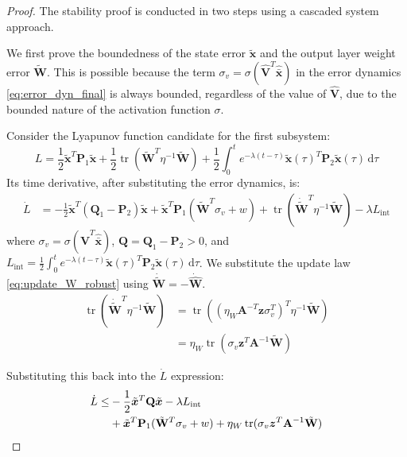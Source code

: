 \documentclass[11pt, a4paper]{article}
\newcommand{\tr}{\operatorname{tr}}
\newcommand{\ud}{\,\mathrm{d}}
\newcommand{\xtilde}{\tilde{\bm{x}}}
\newcommand{\xhatbar}{\hat{\bar{\bm{x}}}}
\newcommand{\Wtilde}{\tilde{\mathbf{W}}}
\newcommand{\What}{\hat{\mathbf{W}}}
\newcommand{\Vhat}{\hat{\mathbf{V}}}
\begin{document}
\begin{proof}
The stability proof is conducted in two steps using a cascaded system approach.


We first prove the boundedness of the state error $\xtilde$ and the output layer weight error $\Wtilde$. This is possible because the term $\sigma_v = \sigma(\Vhat^T \xhatbar)$ in the error dynamics \eqref{eq:error_dyn_final} is always bounded, regardless of the value of $\Vhat$, due to the bounded nature of the activation function $\sigma$.

Consider the Lyapunov function candidate for the first subsystem:
\begin{equation}
    L = \frac{1}{2}\xtilde^T \mathbf{P}_1 \xtilde + \frac{1}{2}\tr(\Wtilde^T \eta^{-1}\Wtilde) + \frac{1}{2} \int_{0}^{t} e^{-\lambda(t-\tau)} \xtilde(\tau)^T \mathbf{P}_2 \xtilde(\tau) \ud\tau
\end{equation}
Its time derivative, after substituting the error dynamics, is:
\begin{align}
    \dot{L} &= -\frac{1}{2}\xtilde^T(\mathbf{Q}_1 - \mathbf{P}_2)\xtilde + \xtilde^T\mathbf{P}_1 (\Wtilde^T \sigma_v + w) + \tr(\dot{\Wtilde}^T\eta^{-1} \Wtilde) - \lambda L_{\text{int}}
\end{align}
where $\sigma_v = \sigma(\Vhat^T\xhatbar)$, $\mathbf{Q} = \mathbf{Q}_1 - \mathbf{P}_2 > 0$, and $L_{\text{int}} = \frac{1}{2} \int_{0}^{t} e^{-\lambda(t-\tau)} \xtilde(\tau)^T \mathbf{P}_2 \xtilde(\tau) \ud\tau$.
We substitute the update law \eqref{eq:update_W_robust} using $\dot{\Wtilde} = -\dot{\What}$. 
\begin{align*}
    \tr(\dot{\Wtilde}^T \eta^{-1}\Wtilde) &= \tr\left( \left(\eta_W \mathbf{A}^{-T}\bm{z}\sigma_v^T \right)^T \eta^{-1}\Wtilde \right) \\
     &= {\eta_W}\tr(\sigma_v \bm{z}^T\mathbf{A}^{-1} \Wtilde)
\end{align*}

Substituting this back into the $\dot{L}$ expression:
\begin{align*}
    \dot{L} \le &-\frac{1}{2}\xtilde^T\mathbf{Q}\xtilde - \lambda L_{\text{int}} \quad \text{\small } \\
    & + \xtilde^T\mathbf{P}_1 (\Wtilde^T \sigma_v + w)+ \eta_W \tr(\sigma_v \bm{z}^T \mathbf{A}^{-1} \Wtilde)
\end{align*}


\end{proof}
\end{document}
